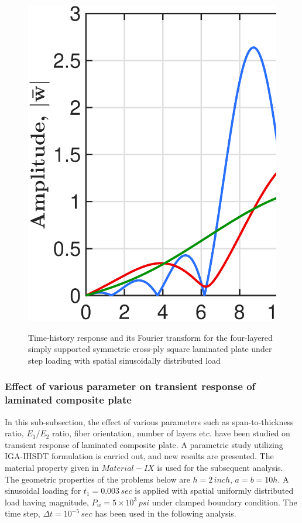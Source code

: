 \documentclass[3p,preprint,12pt]{elsarticle}
\begin{document}
\begin{figure}
\begin{minipage}{\textwidth}
		{\includegraphics[scale=0.3]{For_FFT_h_a.eps}}
	\end{minipage}
	\caption{Time-history response and its Fourier transform for the four-layered simply supported symmetric cross-ply square laminated plate under step loading with spatial sinusoidally distributed load}
	\label{fig:Transient_FFT_Response}
\end{figure}

\subsubsection{Effect of various parameter on transient response of laminated composite plate} \label{parametricstudy_transient}
In this sub-subsection, the effect of various parameters such as span-to-thickness ratio, $E_{1}/E_{2}$ ratio, fiber orientation, number of layers etc. have been studied on transient response of laminated composite plate. A parametric study utilizing IGA-IHSDT formulation is carried out, and new results are presented. The material property given in $Material-IX$ is used for the subsequent analysis. The geometric properties \cite{khdeir1988dynamic} of the problems below are $h=2\,inch$, $a=b=10h$. A sinusoidal loading for $t_{1}=0.003\,sec$ is applied with spatial uniformly distributed load \cite{khdeir1988dynamic} having magnitude, $P_{w}=5\times10^{3}\,psi$ under clamped boundary condition. The time step, $\Delta t=10^{-5}\,sec$ has been used in the following analysis.
\end{document}
